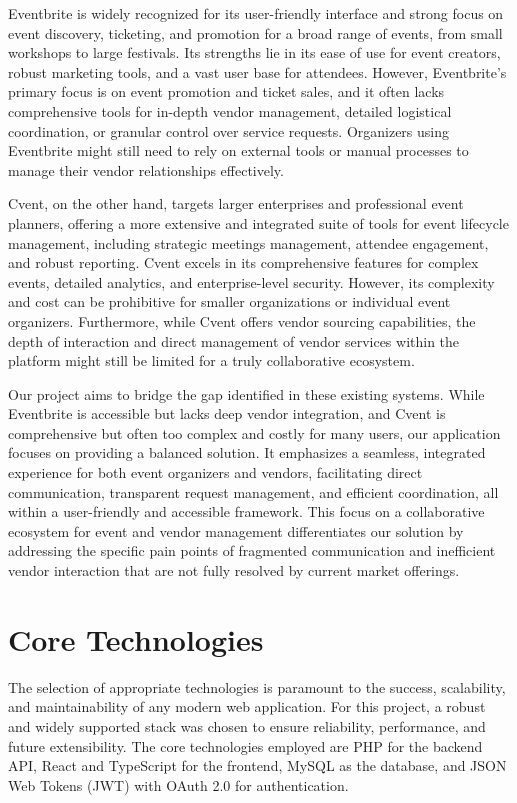 \documentclass{report}
\begin{document}
Eventbrite is widely recognized for its user-friendly interface and strong focus on event discovery, ticketing, and promotion for a broad range of events, from small workshops to large festivals. Its strengths lie in its ease of use for event creators, robust marketing tools, and a vast user base for attendees. However, Eventbrite's primary focus is on event promotion and ticket sales, and it often lacks comprehensive tools for in-depth vendor management, detailed logistical coordination, or granular control over service requests. Organizers using Eventbrite might still need to rely on external tools or manual processes to manage their vendor relationships effectively.

Cvent, on the other hand, targets larger enterprises and professional event planners, offering a more extensive and integrated suite of tools for event lifecycle management, including strategic meetings management, attendee engagement, and robust reporting. Cvent excels in its comprehensive features for complex events, detailed analytics, and enterprise-level security. However, its complexity and cost can be prohibitive for smaller organizations or individual event organizers. Furthermore, while Cvent offers vendor sourcing capabilities, the depth of interaction and direct management of vendor services within the platform might still be limited for a truly collaborative ecosystem.

Our project aims to bridge the gap identified in these existing systems. While Eventbrite is accessible but lacks deep vendor integration, and Cvent is comprehensive but often too complex and costly for many users, our application focuses on providing a balanced solution. It emphasizes a seamless, integrated experience for both event organizers and vendors, facilitating direct communication, transparent request management, and efficient coordination, all within a user-friendly and accessible framework. This focus on a collaborative ecosystem for event and vendor management differentiates our solution by addressing the specific pain points of fragmented communication and inefficient vendor interaction that are not fully resolved by current market offerings.

\section{Core Technologies}
\label{sec:core_technologies}
The selection of appropriate technologies is paramount to the success, scalability, and maintainability of any modern web application. For this project, a robust and widely supported stack was chosen to ensure reliability, performance, and future extensibility. The core technologies employed are PHP for the backend API, React and TypeScript for the frontend, MySQL as the database, and JSON Web Tokens (JWT) with OAuth 2.0 for authentication.
\end{document}
